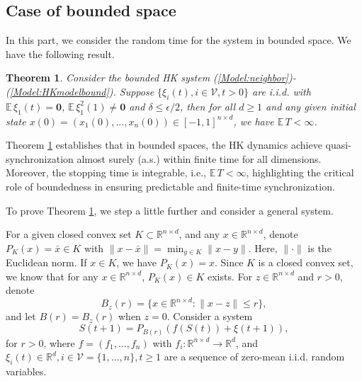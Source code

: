 \documentclass[11pt]{article}
\newtheorem{thm}{Theorem}[section]
\theoremstyle{definition}
\theoremstyle{remark}
\numberwithin{equation}{section}
\begin{document}
\subsection{Case of bounded space}\label{Subsec:boundedspace}

In this part, we consider the random time for the system in bounded space. We have the following result.
\begin{thm}\label{Thm:mainbounded}
Consider the bounded HK system (\ref{Model:neighbor})-(\ref{Model:HKmodelbound}).
Suppose $\{\xi_i(t), i\in\mathcal{V}, t>0\}$ are i.i.d. with $\mathbb{E}\,\xi_1(t)=\textbf{0}$, $\mathbb{E}\, \xi_1^2(1)\neq\textbf{0}$ and $\delta\leq\epsilon/2$, then for all $d\geq 1$ and any given initial state $x(0)=(x_1(0),\ldots,x_n(0))\in [-1,1]^{n\times d}$, we have  $\mathbb{E}\,T<\infty$.
\end{thm}
Theorem \ref{Thm:mainbounded} establishes that in bounded spaces, the HK dynamics achieve quasi-synchronization almost surely (a.s.) within finite time for all dimensions. Moreover, the stopping time is integrable, i.e., $\mathbb{E}\,T<\infty$, highlighting the critical role of boundedness in ensuring predictable and finite-time synchronization.

To prove Theorem \ref{Thm:mainbounded}, we step a little further and consider a general system.

For a given closed convex set $K\subset \mathbb{R}^{n\times d}$, and any $x\in \mathbb{R}^{n\times d}$, denote $P_K(x)=\bar{x}\in K$ with $\| x-\bar{x}\|=\min_{y\in K}\| x-y\|$. Here, $\| \cdot\|$ is the Euclidean norm. If $x\in K$, we have $P_K(x)=x$. Since $K$ is a closed convex set, we know that for any $x\in \mathbb{R}^{n\times d}$, $P_K(x)\in K$ exists. For $z\in\mathbb{R}^{n\times d}$ and $r>0$, denote $$B_z(r)=\{x\in\mathbb{R}^{n\times d}:\| x-z\| \leq r\},$$ and let $B(r)=B_z(r)$ when $z=0$. Consider a system
\begin{equation}\label{Model:randomwalkbound}
  S(t+1)=P_{B(r)}(f(S(t))+\xi(t+1)),
\end{equation}
for $ r>0$, where $f=(f_1,\ldots,f_n)$ with $f_i:\mathbb{R}^{n\times d}\rightarrow \mathbb{R}^d$, and $\xi_i(t)\in \mathbb{R}^d, i\in\mathcal{V}=\{1,\ldots,n\}, t\geq 1$ are a sequence of zero-mean i.i.d. random variables.
\end{document}
